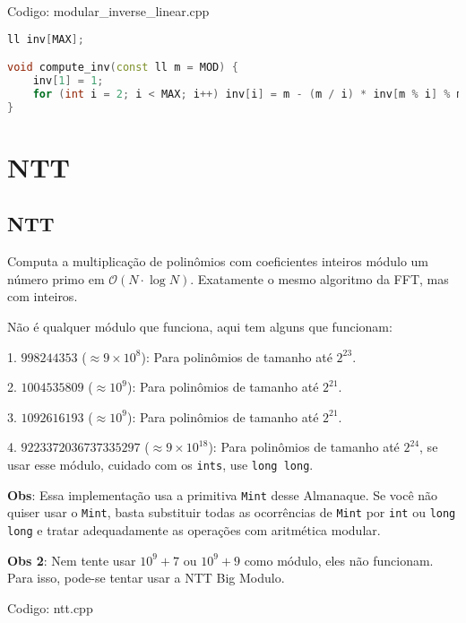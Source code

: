 \documentclass[10pt, a4paper, oneside]{book}
\begin{document}
Codigo: modular\_inverse\_linear.cpp

\begin{lstlisting}[language=C++]
ll inv[MAX];

void compute_inv(const ll m = MOD) {
    inv[1] = 1;
    for (int i = 2; i < MAX; i++) inv[i] = m - (m / i) * inv[m % i] % m;
}
\end{lstlisting}
\hfill

\section{NTT}
\subsection{NTT}


Computa a multiplicação de polinômios com coeficientes inteiros módulo um número primo em $\mathcal{O}(N \cdot \log N)$. Exatamente o mesmo algoritmo da FFT, mas com inteiros.



Não é qualquer módulo que funciona, aqui tem alguns que funcionam:



1. $998244353$ ($\approx 9 \times 10^8$): Para polinômios de tamanho até $2^{23}$.

2. $1004535809$ ($\approx 10^9$): Para polinômios de tamanho até $2^{21}$.

3. $1092616193$ ($\approx 10^9$): Para polinômios de tamanho até $2^{21}$.

4. $9223372036737335297$ ($\approx 9 \times 10^{18}$): Para polinômios de tamanho até $2^{24}$, se usar esse módulo, cuidado com os \texttt{ints}, use \texttt{long long}.



\textbf{Obs}: Essa implementação usa a primitiva \texttt{Mint} desse Almanaque. Se você não quiser usar o \texttt{Mint}, basta substituir todas as ocorrências de \texttt{Mint} por \texttt{int} ou \texttt{long long} e tratar adequadamente as operações com aritmética modular.



\textbf{Obs 2}: Nem tente usar $10^9 + 7$ ou $10^9 + 9$ como módulo, eles não funcionam. Para isso, pode-se tentar usar a NTT Big Modulo.
\hfill

Codigo: ntt.cpp
\end{document}
